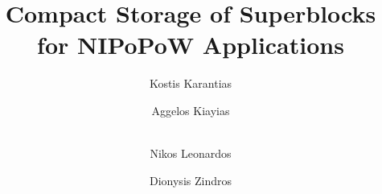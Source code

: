 \title{Compact Storage of Superblocks\\for NIPoPoW Applications}

\ifanonymous
   \author{}
   \institute{}
\else
   \author{
           Kostis Karantias  \and
           Aggelos Kiayias  \and\\
           Nikos Leonardos  \and
           Dionysis Zindros 
   }
\fi
\maketitle
